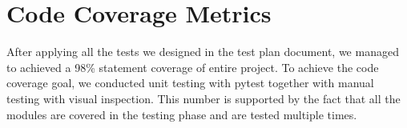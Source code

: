 \documentclass[12pt, titlepage]{article}
\begin{document}
\section{Code Coverage Metrics}
After applying all the tests we designed in the test plan document, we managed
to achieved a 98\% statement coverage of entire project. To achieve the code
coverage goal, we conducted unit testing with pytest together with manual
testing with visual inspection. This number is supported by the fact that all
the modules are covered in the testing phase and are tested multiple times. 




\end{document}
